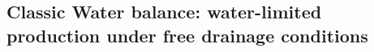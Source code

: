 %
%
%
%
%
%


\subsection{Classic Water balance: water-limited production under free drainage conditions}
\label{sec:WATFD}

